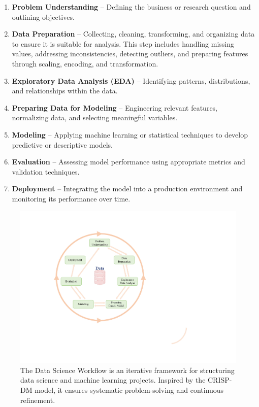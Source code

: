 \documentclass[
]{book}
\providecommand{\tightlist}{%
  \setlength{\itemsep}{0pt}\setlength{\parskip}{0pt}}
\theoremstyle{definition}
\theoremstyle{definition}
\theoremstyle{definition}
\theoremstyle{definition}
\theoremstyle{remark}
\begin{document}
\begin{enumerate}
\def\labelenumi{\arabic{enumi}.}
\tightlist
\item
  \textbf{Problem Understanding} -- Defining the business or research question and outlining objectives.\\
\item
  \textbf{Data Preparation} -- Collecting, cleaning, transforming, and organizing data to ensure it is suitable for analysis. This step includes handling missing values, addressing inconsistencies, detecting outliers, and preparing features through scaling, encoding, and transformation.\\
\item
  \textbf{Exploratory Data Analysis (EDA)} -- Identifying patterns, distributions, and relationships within the data.\\
\item
  \textbf{Preparing Data for Modeling} -- Engineering relevant features, normalizing data, and selecting meaningful variables.\\
\item
  \textbf{Modeling} -- Applying machine learning or statistical techniques to develop predictive or descriptive models.\\
\item
  \textbf{Evaluation} -- Assessing model performance using appropriate metrics and validation techniques.\\
\item
  \textbf{Deployment} -- Integrating the model into a production environment and monitoring its performance over time.
\end{enumerate}

\begin{figure}

{\centering \includegraphics[width=0.6\linewidth]{images/DSW} 

}

\caption{The Data Science Workflow is an iterative framework for structuring data science and machine learning projects. Inspired by the CRISP-DM model, it ensures systematic problem-solving and continuous refinement.}\label{fig:DSW}
\end{figure}
\end{document}
